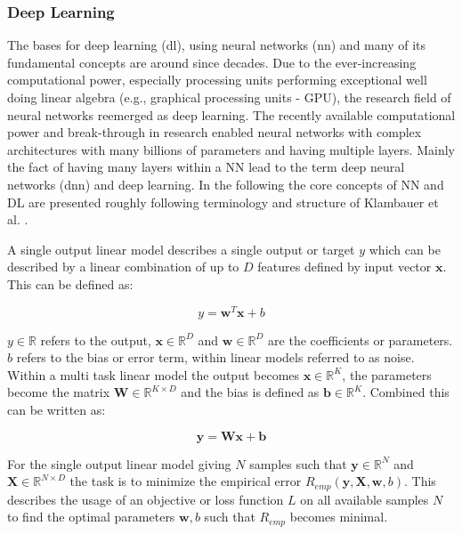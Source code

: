 \documentclass[../main.tex]{subfiles}
\begin{document}
\subsubsection{Deep Learning} \label{sssec:dl}

The bases for deep learning (\acs{dl}), using neural networks (\acs{nn}) and many of its fundamental concepts are around since decades. Due to the ever-increasing computational power, especially processing units performing exceptional well doing linear algebra (e.g., graphical processing units - GPU), the research field of neural networks reemerged as deep learning. The recently available computational power and break-through in research enabled neural networks with complex architectures with many billions of parameters and having multiple layers. Mainly the fact of having many layers within a NN lead to the term deep neural networks (\acs{dnn}) and deep learning. In the following the core concepts of NN and DL are presented roughly following terminology and structure of Klambauer et al. \cite{klambauer_notes_2019}.

 \label{par:linear_model}

A single output linear model describes a single output or target $y$ which can be described by a linear combination of up to $D$ features defined by input vector $\mathbf{x}$. This can be defined as:

\begin{equation} \label{eq:single_linear}
    y=\mathbf{w}^T\mathbf{x} + b
\end{equation}

$y \in \mathbb{R}$ refers to the output, $\mathbf{x}\in \mathbb{R}^D$ and $ \mathbf{w}\in \mathbb{R}^D$ are the coefficients or parameters. $b$ refers to the bias or error term, within linear models referred to as noise. Within a multi task linear model the output becomes $\mathbf{x}\in \mathbb{R}^K$, the parameters become the matrix $\mathbf{W} \in \mathbb{R}^{K \times D}$ and the bias is defined as $\mathbf{b}\in \mathbb{R}^K$. Combined this can be written as:

\begin{equation}
    \mathbf{y}=\mathbf{W}\mathbf{x} + \mathbf{b}
\end{equation}

For the single output linear model giving $N$ samples such that $\mathbf{y}\in \mathbb{R}^{N}$ and $\mathbf{X}\in \mathbb{R}^{N \times D}$ the task is to minimize the empirical error $R_{emp}(\mathbf{y}, \mathbf{X}, \mathbf{w}, b)$. This describes the usage of an objective or loss function $L$ on all available samples $N$ to find the optimal parameters $\mathbf{w}, b$ such that $R_{emp}$ becomes minimal. 
\end{document}
